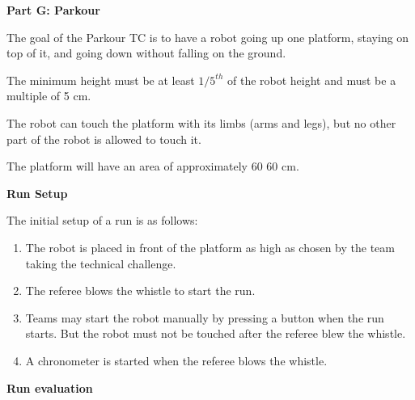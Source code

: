 \clearpage
\sffamily
{\bfseries\color[rgb]{0.4,0.4,0.4} Part G: Parkour}
{}


\bigskip

The goal of the Parkour TC is to have a robot going up one platform, staying on top of it, and going down without falling on the ground.

The minimum height must be at least $1/5^{th}$ of the robot height and must be a multiple of 5 cm.

The robot can touch the platform with its limbs (arms and legs), but no other part of the robot is allowed to touch it.

The platform will have an area of approximately 60 {\texttimes} 60 cm.

\bigskip

{\bfseries Run Setup}

\smallskip

The initial setup of a run is as follows:

\begin{enumerate}

\item The robot is placed in front of the platform as high as chosen by the team taking the technical challenge.

\item The referee blows the whistle to start the run.

\item Teams may start the robot manually by pressing a button when the run starts. But the robot must not be touched after the referee blew the whistle. 

\item A chronometer is started when the referee blows the whistle.
\end{enumerate}

{\bfseries Run evaluation}

\smallskip

